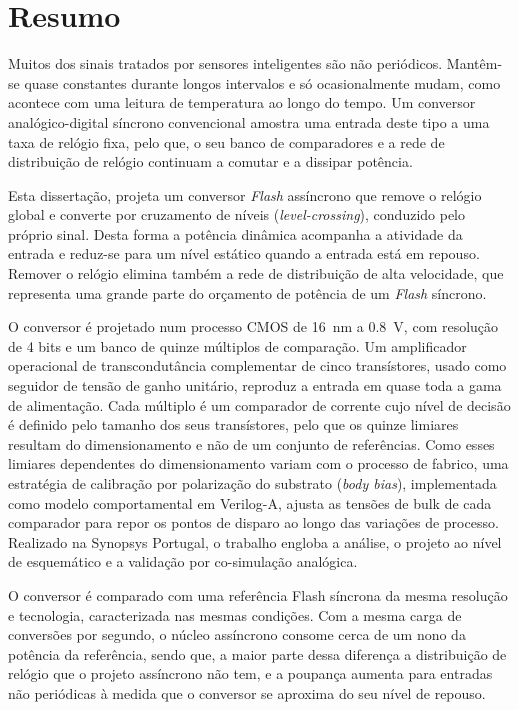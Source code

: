 \chapter*{Resumo} \label{chap:Resumo}

Muitos dos sinais tratados por sensores inteligentes são não periódicos. Mantêm-se quase constantes durante longos
intervalos e só ocasionalmente mudam, como acontece com uma leitura de
temperatura ao longo do tempo. Um conversor analógico-digital síncrono
convencional amostra uma entrada deste tipo a uma taxa de relógio fixa, pelo que,
o seu banco de comparadores e a rede de distribuição de relógio continuam a
comutar e a dissipar potência.

Esta dissertação, projeta um conversor \textit{Flash} assíncrono que remove o relógio
global e converte por cruzamento de níveis (\textit{level-crossing}), conduzido pelo
próprio sinal. Desta forma a potência dinâmica acompanha a atividade da
entrada e reduz-se para um nível estático quando a entrada está em repouso. Remover o
relógio elimina também a rede de distribuição de alta velocidade, que representa
uma grande parte do orçamento de potência de um \textit{Flash} síncrono.

O conversor é projetado num processo CMOS de 16~nm a 0.8~V, com resolução de
4 bits e um banco de quinze múltiplos de comparação. Um amplificador operacional de
transcondutância complementar de cinco transístores, usado como seguidor de
tensão de ganho unitário, reproduz a entrada em quase toda a gama de alimentação.
 Cada múltiplo é um comparador de corrente cujo nível de decisão é definido pelo tamanho dos seus
transístores, pelo que os quinze limiares resultam do dimensionamento e não de
um conjunto de referências. Como esses limiares dependentes do dimensionamento
variam com o processo de fabrico, uma estratégia de calibração por
polarização do substrato (\textit{body bias}), implementada como modelo comportamental
em Verilog-A, ajusta as tensões de bulk de cada comparador para repor os pontos de
disparo ao longo das variações de processo. Realizado na Synopsys Portugal, o
trabalho engloba a análise, o projeto ao nível de esquemático e a validação por
co-simulação analógica.

O conversor é comparado com uma referência Flash síncrona da mesma resolução e
tecnologia, caracterizada nas mesmas condições. Com a mesma carga de conversões
por segundo, o núcleo assíncrono consome cerca de um nono da potência da
referência, sendo que, a maior parte dessa diferença a distribuição de relógio que o
projeto assíncrono não tem, e a poupança aumenta para entradas não periódicas à
medida que o conversor se aproxima do seu nível de repouso.